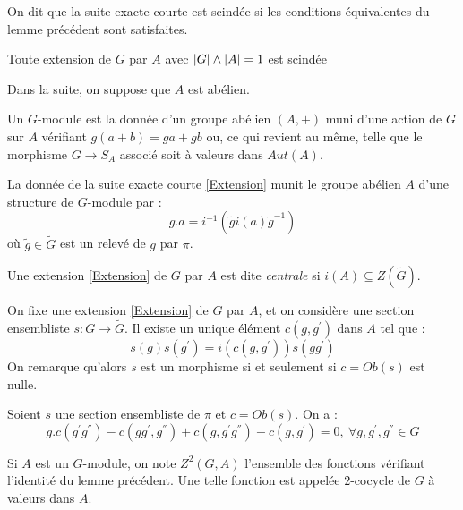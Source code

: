 \documentclass{cours}
\begin{document}
\begin{definition}
    On dit que la suite exacte courte est scindée si les conditions équivalentes du lemme précédent sont satisfaites.
\end{definition}

\begin{theorem}
    Toute extension de $G$ par $A$ avec $\left|G\right| \wedge \left|A\right| = 1$ est scindée
\end{theorem}

Dans la suite, on suppose que $A$ est abélien.

\begin{definition}
    Un $G$-module est la donnée d'un groupe abélien $(A, +)$ muni d'une action de $G$ sur $A$ vérifiant $g(a + b) = ga + gb$ ou, ce qui revient au même, telle que le morphisme $G \rightarrow S_{A}$ associé soit à valeurs dans $Aut(A)$.
\end{definition}

\begin{proposition}
    La donnée de la suite exacte courte \ref{Extension} munit le groupe abélien $A$ d'une structure de $G$-module par :
    \[
        g.a = i^{-1}\left(\tilde{g}i(a)\tilde{g}^{-1}\right)
    \]
    où $\tilde{g} \in \tilde{G}$ est un relevé de $g$ par $\pi$.
\end{proposition}

\begin{example}
    Une extension \ref{Extension} de $G$ par $A$ est dite \emph{centrale} si $i(A) \subseteq Z(\tilde{G})$.
\end{example}

On fixe une extension \ref{Extension} de $G$ par $A$, et on considère une section ensembliste $s : G \rightarrow \tilde{G}$. Il existe un unique élément $c(g, g^{'})$ dans $A$ tel que :
\[
    s(g)s(g^{'}) = i(c(g, g^{'}))s(gg^{'})
\]
On remarque qu'alors $s$ est un morphisme si et seulement si $c = Ob(s)$ est nulle.

\begin{lemma}
    Soient $s$ une section ensembliste de $\pi$ et $c = Ob(s)$. On a :
    \[
        g.c(g^{'}g^{''}) - c(gg^{'}, g^{''}) + c(g, g^{'}g^{''}) - c(g, g^{'}) = 0, \ \forall g, g^{'}, g^{''} \in G
    \]
\end{lemma}

\begin{definition}
    Si $A$ est un $G$-module, on note $Z^{2}(G, A)$ l'ensemble des fonctions vérifiant l'identité du lemme précédent. Une telle fonction est appelée $2$-cocycle de $G$ à valeurs dans $A$.
\end{definition}
\end{document}
